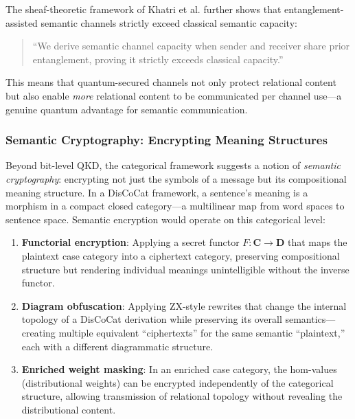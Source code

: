 \documentclass[
]{article}
\providecommand{\tightlist}{%
  \setlength{\itemsep}{0pt}\setlength{\parskip}{0pt}}
\numberwithin{equation}{section}
\begin{document}
The sheaf-theoretic framework of Khatri et al.
\citeyearpar{khatri2025quantum} further shows that entanglement-assisted
semantic channels strictly exceed classical semantic capacity:

\begin{quote}
``We derive semantic channel capacity when sender and receiver share
prior entanglement, proving it strictly exceeds classical capacity.''
\citep{khatri2025quantum}
\end{quote}

This means that quantum-secured channels not only protect relational
content but also enable \emph{more} relational content to be
communicated per channel use---a genuine quantum advantage for semantic
communication.

\subsubsection{Semantic Cryptography: Encrypting Meaning
Structures}\label{semantic-cryptography-encrypting-meaning-structures}

Beyond bit-level QKD, the categorical framework suggests a notion of
\emph{semantic cryptography}: encrypting not just the symbols of a
message but its compositional meaning structure. In a DisCoCat
framework, a sentence's meaning is a morphism in a compact closed
category---a multilinear map from word spaces to sentence space.
Semantic encryption would operate on this categorical level:

\begin{enumerate}
\def\labelenumi{\arabic{enumi}.}
\tightlist
\item
  \textbf{Functorial encryption}: Applying a secret functor
  \(F\colon \mathbf{C} \to \mathbf{D}\) that maps the plaintext case
  category into a ciphertext category, preserving compositional
  structure but rendering individual meanings unintelligible without the
  inverse functor.
\item
  \textbf{Diagram obfuscation}: Applying ZX-style rewrites that change
  the internal topology of a DisCoCat derivation while preserving its
  overall semantics---creating multiple equivalent ``ciphertexts'' for
  the same semantic ``plaintext,'' each with a different diagrammatic
  structure.
\item
  \textbf{Enriched weight masking}: In an enriched case category, the
  hom-values (distributional weights) can be encrypted independently of
  the categorical structure, allowing transmission of relational
  topology without revealing the distributional content.
\end{enumerate}
\end{document}
